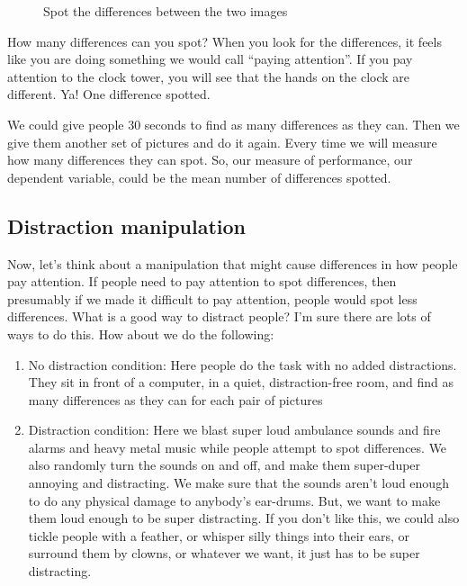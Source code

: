 \documentclass[
]{book}
\makeatletter
\newcommand*\pandocbounded[1]{%
  \sbox\pandoc@box{#1}%
  \Gscale@div\@tempa{\textheight}{\dimexpr\ht\pandoc@box+\dp\pandoc@box\relax}%
  \Gscale@div\@tempb{\linewidth}{\wd\pandoc@box}%
  \ifdim\@tempb\p@<\@tempa\p@\let\@tempa\@tempb\fi%
  \ifdim\@tempa\p@<\p@\scalebox{\@tempa}{\usebox\pandoc@box}%
  \else\usebox{\pandoc@box}%
  \fi%
}
\makeatother
\begin{document}
\begin{figure}
\centering
\pandocbounded{\texttt{[image: figures/spot\_dif.png]}}
\caption{\label{fig:9spotdiff}Spot the differences between the two images}
\end{figure}

How many differences can you spot? When you look for the differences, it feels like you are doing something we would call ``paying attention''. If you pay attention to the clock tower, you will see that the hands on the clock are different. Ya! One difference spotted.

We could give people 30 seconds to find as many differences as they can. Then we give them another set of pictures and do it again. Every time we will measure how many differences they can spot. So, our measure of performance, our dependent variable, could be the mean number of differences spotted.

\subsection{Distraction manipulation}\label{distraction-manipulation}

Now, let's think about a manipulation that might cause differences in how people pay attention. If people need to pay attention to spot differences, then presumably if we made it difficult to pay attention, people would spot less differences. What is a good way to distract people? I'm sure there are lots of ways to do this. How about we do the following:

\begin{enumerate}
\def\labelenumi{\arabic{enumi}.}
\item
  No distraction condition: Here people do the task with no added distractions. They sit in front of a computer, in a quiet, distraction-free room, and find as many differences as they can for each pair of pictures
\item
  Distraction condition: Here we blast super loud ambulance sounds and fire alarms and heavy metal music while people attempt to spot differences. We also randomly turn the sounds on and off, and make them super-duper annoying and distracting. We make sure that the sounds aren't loud enough to do any physical damage to anybody's ear-drums. But, we want to make them loud enough to be super distracting. If you don't like this, we could also tickle people with a feather, or whisper silly things into their ears, or surround them by clowns, or whatever we want, it just has to be super distracting.
\end{enumerate}
\end{document}
